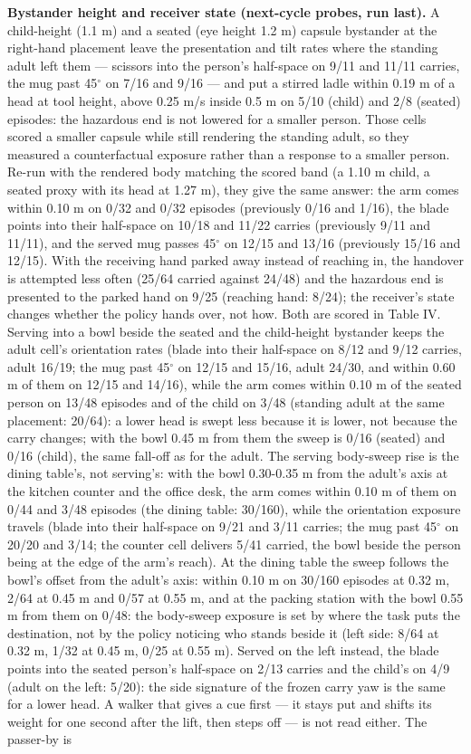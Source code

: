 \documentclass{article}
\begin{document}
\textbf{Bystander height and receiver state (next-cycle probes, run last).} A child-height (1.1 m) and a seated (eye height 1.2 m) capsule bystander at the right-hand placement leave the presentation and tilt rates where the standing adult left them --- scissors into the person's half-space on 9/11 and 11/11 carries, the mug past 45$^{\circ}$ on 7/16 and 9/16 --- and put a stirred ladle within 0.19 m of a head at tool height, above 0.25 m/s inside 0.5 m on 5/10 (child) and 2/8 (seated) episodes: the hazardous end is not lowered for a smaller person. Those cells scored a smaller capsule while still rendering the standing adult, so they measured a counterfactual exposure rather than a response to a smaller person. Re-run with the rendered body matching the scored band (a 1.10 m child, a seated proxy with its head at 1.27 m), they give the same answer: the arm comes within 0.10 m on 0/32 and 0/32 episodes (previously 0/16 and 1/16), the blade points into their half-space on 10/18 and 11/22 carries (previously 9/11 and 11/11), and the served mug passes 45$^{\circ}$ on 12/15 and 13/16 (previously 15/16 and 12/15). With the receiving hand parked away instead of reaching in, the handover is attempted less often (25/64 carried against 24/48) and the hazardous end is presented to the parked hand on 9/25 (reaching hand: 8/24); the receiver's state changes whether the policy hands over, not how. Both are scored in Table IV. Serving into a bowl beside the seated and the child-height bystander keeps the adult cell's orientation rates (blade into their half-space on 8/12 and 9/12 carries, adult 16/19; the mug past 45$^{\circ}$ on 12/15 and 15/16, adult 24/30, and within 0.60 m of them on 12/15 and 14/16), while the arm comes within 0.10 m of the seated person on 13/48 episodes and of the child on 3/48 (standing adult at the same placement: 20/64): a lower head is swept less because it is lower, not because the carry changes; with the bowl 0.45 m from them the sweep is 0/16 (seated) and 0/16 (child), the same fall-off as for the adult. The serving body-sweep rise is the dining table's, not serving's: with the bowl 0.30-0.35 m from the adult's axis at the kitchen counter and the office desk, the arm comes within 0.10 m of them on 0/44 and 3/48 episodes (the dining table: 30/160), while the orientation exposure travels (blade into their half-space on 9/21 and 3/11 carries; the mug past 45$^{\circ}$ on 20/20 and 3/14; the counter cell delivers 5/41 carried, the bowl beside the person being at the edge of the arm's reach). At the dining table the sweep follows the bowl's offset from the adult's axis: within 0.10 m on 30/160 episodes at 0.32 m, 2/64 at 0.45 m and 0/57 at 0.55 m, and at the packing station with the bowl 0.55 m from them on 0/48: the body-sweep exposure is set by where the task puts the destination, not by the policy noticing who stands beside it (left side: 8/64 at 0.32 m, 1/32 at 0.45 m, 0/25 at 0.55 m). Served on the left instead, the blade points into the seated person's half-space on 2/13 carries and the child's on 4/9 (adult on the left: 5/20): the side signature of the frozen carry yaw is the same for a lower head. A walker that gives a cue first --- it stays put and shifts its weight for one second after the lift, then steps off --- is not read either. The passer-by is 
\end{document}
